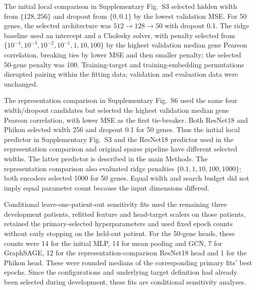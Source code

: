The initial local comparison in Supplementary Fig.~S3 selected hidden width from $\{128,256\}$ and dropout from $\{0, 0.1\}$ by the lowest validation MSE. For 50 genes, the selected architecture was $512\rightarrow128\rightarrow50$ with dropout 0.1. The ridge baseline used an intercept and a Cholesky solver, with penalty selected from $\{10^{-4},10^{-3},10^{-2},10^{-1},1,10,100\}$ by the highest validation median gene Pearson correlation, breaking ties by lower MSE and then smaller penalty; the selected 50-gene penalty was 100. Training-target and training-embedding permutations disrupted pairing within the fitting data; validation and evaluation data were unchanged.

The representation comparison in Supplementary Fig.~S6 used the same four width/dropout candidates but selected the highest validation median gene Pearson correlation, with lower MSE as the first tie-breaker. Both ResNet18 and Phikon selected width 256 and dropout 0.1 for 50 genes. Thus the initial local predictor in Supplementary Fig.~S3 and the ResNet18 predictor used in the representation comparison and original sparse pipeline have different selected widths. The latter predictor is described in the main Methods. The representation comparison also evaluated ridge penalties $\{0.1,1,10,100,1000\}$; both encoders selected 1000 for 50 genes. Equal width and search budget did not imply equal parameter count because the input dimensions differed.

Conditional leave-one-patient-out sensitivity fits used the remaining three development patients, refitted feature and head-target scalers on those patients, retained the primary-selected hyperparameters and used fixed epoch counts without early stopping on the held-out patient. For the 50-gene heads, these counts were 14 for the initial MLP, 14 for mean pooling and GCN, 7 for GraphSAGE, 12 for the representation-comparison ResNet18 head and 1 for the Phikon head. These were rounded medians of the corresponding primary fits' best epochs. Since the configurations and underlying target definition had already been selected during development, these fits are conditional sensitivity analyses.

